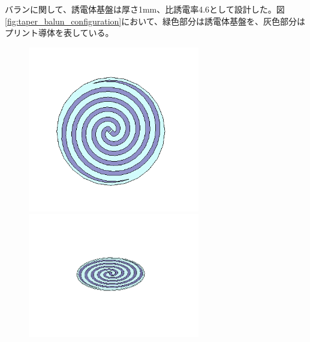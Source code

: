 \documentclass[11pt,a4paper,uplatex]{ujarticle}
\begin{document}
  バランに関して、誘電体基盤は厚さ1mm、比誘電率4.6として設計した。図\ref{fig:taper_balun_configuration}において、緑色部分は誘電体基盤を、灰色部分は
  プリント導体を表している。


  \begin{figure}[tbp]
    \begin{minipage}[b]{0.495\textwidth}
      \centering
      \includegraphics[keepaspectratio, width=75mm]{Images/spiral_antenna_configuration.png}
    \end{minipage}
    \begin{minipage}[b]{0.495\textwidth}
      \centering
      \includegraphics[keepaspectratio, width=75mm]{Images/spiral_withoutcord.png}
    \end{minipage}
  \end{figure}
\end{document}
